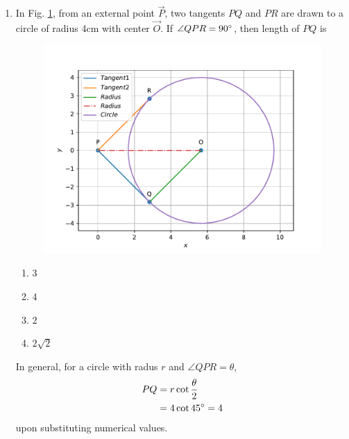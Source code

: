 \documentclass[journal,12pt,twocolumn]{IEEEtran}
\begin{document}
\begin{enumerate}
\item In Fig. 
	\ref{fig:matrix-10-18.pdf}, from an external point $\vec{P}$, two tangents ${PQ}$ and ${PR}$ are drawn to a circle of radius 4cm with center $\vec{O}$. If $\angle{QPR} = 90\degree$, then length of ${PQ}$ is
  \begin{figure}
	  \centering 
	  \includegraphics[width=\columnwidth]{figs/matrix-10-18.pdf}
	  \caption{}
	  \label{fig:matrix-10-18.pdf}
	  \end{figure}
\begin{enumerate}
    \item $3$
    \item $4$
    \item $2$
    \item $2\sqrt{2}$
\end{enumerate}
\solution In general, for a circle with radus $r$ and $\angle{QPR} = \theta$, 
\begin{align}
	PQ &= r \cot \frac{\theta}{2}
	\\
	&= 4 \cot 45 \degree = 4
\end{align}
upon substituting numerical values.
 

\end{enumerate}
\end{document}
